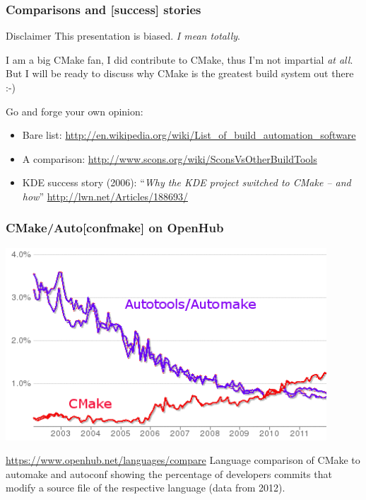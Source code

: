 \documentclass[compress,slidestop,table
              ]
               {beamer}
\begin{document}
\begin{frame}
\frametitle{Comparisons and [success] stories}

\begin{alertblock}{Disclaimer}
This presentation is biased. \emph{I mean totally}.

I am a big CMake fan, I did contribute to CMake, thus I'm not
impartial \emph{at all}. But I will be ready to discuss why CMake
is the greatest build system out there :-)
\end{alertblock}

Go and forge your own opinion:
\begin{itemize}
\item Bare list: \url{http://en.wikipedia.org/wiki/List_of_build_automation_software}
\item A comparison: \url{http://www.scons.org/wiki/SconsVsOtherBuildTools}
\item KDE success story (2006): ``\textsl{Why the KDE project switched to CMake -- and how}''
     \url{http://lwn.net/Articles/188693/}
\end{itemize}
\end{frame}

\begin{frame}
\frametitle{CMake/Auto[conf\textbar make] on OpenHub}
\begin{center}
\includegraphics[width=0.9\textwidth,height=0.50\textheight]{compare_cmake_autotools_ohlo_color_transparent}
\end{center}
\begin{block}{\url{https://www.openhub.net/languages/compare}}
Language comparison of CMake to automake and
autoconf showing the percentage of developers commits that modify a
source file of the respective language (data from 2012).
\end{block}
\end{frame}
\end{document}
